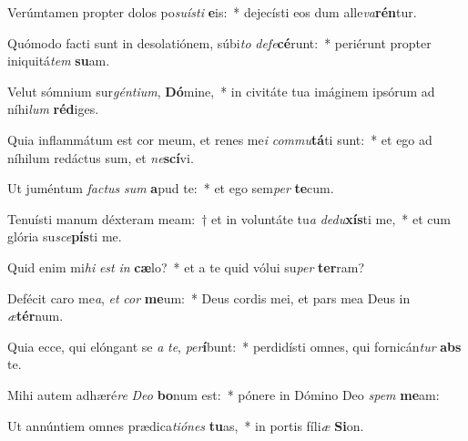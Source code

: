 \item Verúmtamen propter dolos po\textit{su}\textit{ís}\textit{ti} \textbf{e}is:~* dejecísti eos dum alle\textit{va}\textbf{rén}tur.
\item Quómodo facti sunt in desolatiónem, súbi\textit{to} \textit{de}\textit{fe}\textbf{cé}runt:~* periérunt propter iniquitá\textit{tem} \textbf{su}am.
\item Velut sómnium sur\textit{gén}\textit{ti}\textit{um}, \textbf{Dó}mine,~* in civitáte tua imáginem ipsórum ad níhi\textit{lum} \textbf{réd}iges.
\item Quia inflammátum est cor meum, et renes me\textit{i} \textit{com}\textit{mu}\textbf{tá}ti sunt:~* et ego ad níhilum redáctus sum, et \textit{ne}\textbf{scí}vi.
\item Ut juméntum \textit{fac}\textit{tus} \textit{sum} \textbf{a}pud te:~* et ego sem\textit{per} \textbf{te}cum.
\item Tenuísti manum déxteram meam:~† et in voluntáte tu\textit{a} \textit{de}\textit{du}\textbf{xís}ti me,~* et cum glória su\textit{sce}\textbf{pís}ti me.
\item Quid enim mi\textit{hi} \textit{est} \textit{in} \textbf{cæ}lo?~* et a te quid vólui su\textit{per} \textbf{ter}ram?
\item Defécit caro me\textit{a}, \textit{et} \textit{cor} \textbf{me}um:~* Deus cordis mei, et pars mea Deus in \textit{æ}\textbf{tér}num.
\item Quia ecce, qui elóngant se \textit{a} \textit{te}, \textit{per}\textbf{í}bunt:~* perdidísti omnes, qui fornicán\textit{tur} \textbf{abs} te.
\item Mihi autem adhæré\textit{re} \textit{De}\textit{o} \textbf{bo}num est:~* pónere in Dómino Deo \textit{spem} \textbf{me}am:
\item Ut annúntiem omnes prædica\textit{ti}\textit{ó}\textit{nes} \textbf{tu}as,~* in portis fíli\textit{æ} \textbf{Si}on.
